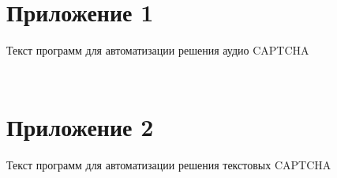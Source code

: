 \appendix
\newpage
\chapter*{\raggedleft\label{appendix1}Приложение 1}

\begin{center}
\label{code:appendix}Текст программ для автоматизации решения аудио CAPTCHA
\end{center}

\begin{code}
    \vspace{-1cm}
    \inputminted{python}{code/audiocaptcha/audiocaptcha.py}
\end{code}

\begin{code}
    \vspace{-1cm}
    \inputminted{python}{code/audiocaptcha/audiocaptcha_solve.py}
\end{code}

\appendix
\newpage
\chapter*{\raggedleft\label{appendix2}Приложение 2}

\begin{center}
\label{code:appendix2}Текст программ для автоматизации решения текстовых CAPTCHA
\end{center}

\begin{code}
    \vspace{-1cm}
    \inputminted{python}{code/textcaptcha/gen-dataset.py}
\end{code}

\begin{code}
    \vspace{-1cm}
    \inputminted{python}{code/textcaptcha/preprocessing.py}
\end{code}

